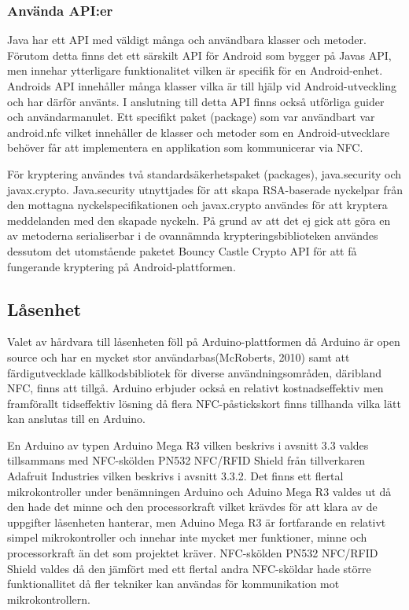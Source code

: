 \documentclass[11pt]{article}
\begin{document}
\subsubsection{Använda API:er}
Java har ett API med väldigt många och användbara klasser och metoder. Förutom detta finns det ett särskilt API för Android som bygger på Javas API, men innehar ytterligare funktionalitet vilken är specifik för en Android-enhet. Androids API innehåller många klasser vilka är till hjälp vid Android-utveckling och har därför använts. I anslutning till detta API finns också utförliga guider och användarmanulet. Ett specifikt paket (package) som var användbart var android.nfc vilket innehåller de klasser och metoder som en Android-utvecklare behöver får att implementera en applikation som kommunicerar via NFC.

För kryptering användes två standardsäkerhetspaket (packages),  java.security och javax.crypto. Java.security utnyttjades för att skapa RSA-baserade nyckelpar från den mottagna nyckelspecifikationen och  javax.crypto användes för att kryptera meddelanden med den skapade nyckeln. På grund av att det ej gick att göra en av metoderna serialiserbar i de ovannämnda krypteringsbiblioteken användes dessutom det utomstående paketet Bouncy Castle Crypto API  för att få fungerande kryptering på Android-plattformen. 

\subsection{Låsenhet}
Valet av hårdvara till låsenheten föll på Arduino-plattformen då Arduino är open source och har en mycket stor användarbas(McRoberts, 2010) samt att färdigutvecklade källkodsbibliotek för diverse användningsområden, däribland NFC, finns att tillgå. Arduino erbjuder också en relativt kostnadseffektiv men framförallt tidseffektiv lösning då flera NFC-påstickskort finns tillhanda vilka lätt kan anslutas till en Arduino.

En Arduino av typen Arduino Mega R3 vilken beskrivs i avsnitt 3.3 valdes tillsammans med NFC-skölden PN532 NFC/RFID Shield från tillverkaren Adafruit Industries vilken beskrivs i avsnitt 3.3.2. Det finns ett flertal mikrokontroller under benämningen Arduino och Aduino Mega R3 valdes ut då den hade det minne och den processorkraft vilket krävdes för att klara av de uppgifter låsenheten hanterar, men Aduino Mega R3 är fortfarande en relativt simpel mikrokontroller och innehar inte mycket mer funktioner, minne och processorkraft än det som projektet kräver. NFC-skölden PN532 NFC/RFID Shield valdes då den jämfört med ett flertal andra NFC-sköldar hade större funktionallitet då fler tekniker kan användas för kommunikation mot mikrokontrollern.
\end{document}
